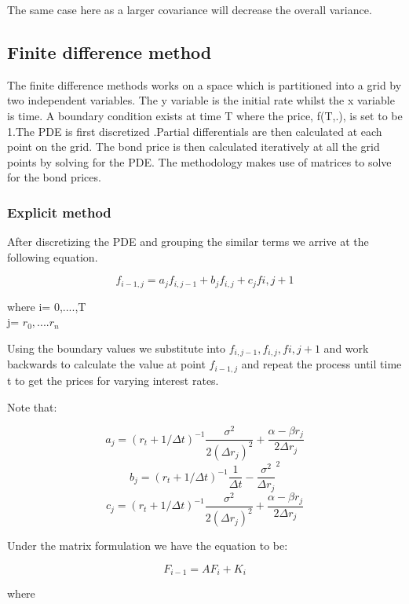 \documentclass[12pt,a4paper]{article}
\begin{document}
The same case here as a larger covariance will decrease the overall variance. 


    





\subsection{Finite difference method}

The finite difference methods works on a space which is partitioned into a grid by two independent variables. The y variable is the initial rate whilst the x variable is time. A boundary condition exists at time T where the price, f(T,.), is set to be 1.The PDE is first discretized .Partial differentials are then calculated at each point on the grid. The bond price is then calculated iteratively at all the grid points by solving for the PDE. The methodology makes use of matrices to solve for the bond prices.  


\subsubsection{Explicit method}

After discretizing the PDE and grouping the similar terms we arrive at the following equation.  

$$f_{i-1,j}=a_{j}f_{i,j-1}+b_{j}f_{i,j}+c_{j}f{i,j+1}$$ 

where i= 0,....,T \\
      j= $r_0, ....r_n$
      
Using the boundary values we substitute into $f_{i,j-1}, f_{i,j}, f{i,j+1}$ and work backwards to calculate the value at point $f_{i-1,j}$ and repeat the process until time t to get the prices for varying interest rates. 

Note that:       
                                                                                                                                

$$a_{j}=(r_t+1/\Delta t)^{-1}\frac{\sigma^{2}}{2(\Delta r_j)^{2}}+\frac{\alpha-\beta r_j}{2\Delta r_j}$$
$$b_{j}=(r_t+1/\Delta t)^{-1}\frac{1}{\Delta t}-\frac{\sigma^2}{\Delta r_j}^{2}$$
$$c_{j}=(r_t+1/\Delta t)^{-1}\frac{\sigma^{2}}{2(\Delta r_j)^{2}}+\frac{\alpha-\beta r_j}{2\Delta r_j}$$

Under the matrix formulation we have the equation to be:

$$F_{i-1}=AF_{i}+K_{i}$$

where
\end{document}
